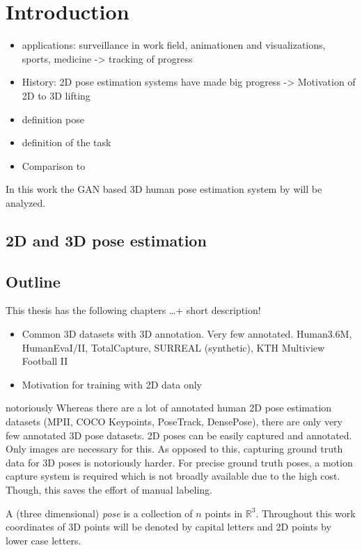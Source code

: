 \section{Introduction}


\begin{itemize}
	\item applications: surveillance in work field, animationen and visualizations, sports, medicine -> tracking of progress
	\item History: 2D pose estimation systems have made big progress -> Motivation of 2D to 3D lifting
	\item definition pose
	\item definition of the task
	\item Comparison to \citet{wandt19}
\end{itemize}

In this work the GAN based 3D human pose estimation system by \citet{drover18} will be analyzed.

\subsection{2D and 3D pose estimation}

\subsection{Outline}
This thesis has the following chapters \dots + short description!


\begin{itemize}
	\item Common 3D datasets with 3D annotation. Very few annotated. Human3.6M, HumanEvaI/II, TotalCapture, SURREAL (synthetic), KTH Multiview Football II
	\item Motivation for training with 2D data only
\end{itemize}

notoriously
Whereas there are a lot of annotated human 2D pose estimation datasets (MPII, COCO Keypoints, PoseTrack, DensePose), there are only very few annotated 3D pose datasets. 
2D poses can be easily captured and annotated.
Only images are necessary for this.
As opposed to this, capturing ground truth data for 3D poses is notoriously harder.
For precise ground truth poses, a motion capture system is required which is not broadly available due to the high cost.
Though, this saves the effort of manual labeling.


A (three dimensional) \textit{pose} is a collection of $n$ points in $\mathbb{R}^3$.
Throughout this work coordinates of 3D points will be denoted by capital letters and 2D points by lower case letters.

